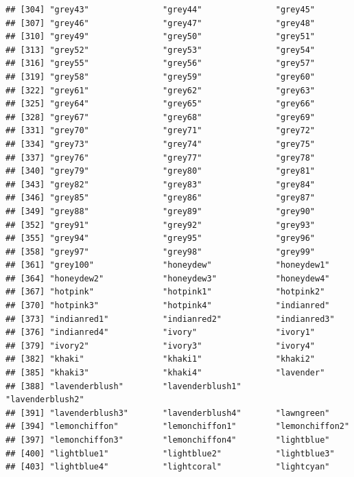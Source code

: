 \documentclass[
]{article}
\begin{document}
\begin{verbatim}
## [304] "grey43"               "grey44"               "grey45"              
## [307] "grey46"               "grey47"               "grey48"              
## [310] "grey49"               "grey50"               "grey51"              
## [313] "grey52"               "grey53"               "grey54"              
## [316] "grey55"               "grey56"               "grey57"              
## [319] "grey58"               "grey59"               "grey60"              
## [322] "grey61"               "grey62"               "grey63"              
## [325] "grey64"               "grey65"               "grey66"              
## [328] "grey67"               "grey68"               "grey69"              
## [331] "grey70"               "grey71"               "grey72"              
## [334] "grey73"               "grey74"               "grey75"              
## [337] "grey76"               "grey77"               "grey78"              
## [340] "grey79"               "grey80"               "grey81"              
## [343] "grey82"               "grey83"               "grey84"              
## [346] "grey85"               "grey86"               "grey87"              
## [349] "grey88"               "grey89"               "grey90"              
## [352] "grey91"               "grey92"               "grey93"              
## [355] "grey94"               "grey95"               "grey96"              
## [358] "grey97"               "grey98"               "grey99"              
## [361] "grey100"              "honeydew"             "honeydew1"           
## [364] "honeydew2"            "honeydew3"            "honeydew4"           
## [367] "hotpink"              "hotpink1"             "hotpink2"            
## [370] "hotpink3"             "hotpink4"             "indianred"           
## [373] "indianred1"           "indianred2"           "indianred3"          
## [376] "indianred4"           "ivory"                "ivory1"              
## [379] "ivory2"               "ivory3"               "ivory4"              
## [382] "khaki"                "khaki1"               "khaki2"              
## [385] "khaki3"               "khaki4"               "lavender"            
## [388] "lavenderblush"        "lavenderblush1"       "lavenderblush2"      
## [391] "lavenderblush3"       "lavenderblush4"       "lawngreen"           
## [394] "lemonchiffon"         "lemonchiffon1"        "lemonchiffon2"       
## [397] "lemonchiffon3"        "lemonchiffon4"        "lightblue"           
## [400] "lightblue1"           "lightblue2"           "lightblue3"          
## [403] "lightblue4"           "lightcoral"           "lightcyan"           

\end{verbatim}
\end{document}
